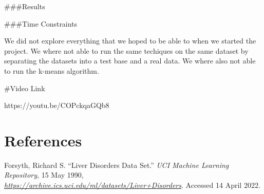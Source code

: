 \documentclass[11pt]{article}
\begin{document}
    \#\#\#Results

    \#\#\#Time Constraints

    We did not explore everything that we hoped to be able to when we
started the project. We where not able to run the same techiques on the
same dataset by separating the datasets into a test base and a real
data. We where also not able to run the k-means algorithm.

    \#Video Link

    https://youtu.be/COPckqaGQb8

    \hypertarget{references}{%
\section{References}\label{references}}

    Forsyth, Richard S. ``Liver Disorders Data Set.'' \emph{UCI Machine
Learning Repository}, 15 May 1990,
\href{https://archive.ics.uci.edu/ml/datasets/Liver+Disorders}{\emph{https://archive.ics.uci.edu/ml/datasets/Liver+Disorders}}.
Accessed 14 April 2022.


    
    
    
\end{document}
